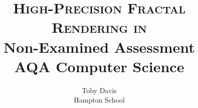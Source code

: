 \documentclass[12pt]{article}
\author{Toby Davis\\[0.2cm]Hampton School}
\title{
	\textsc{High-Precision Fractal Rendering in \CPP}\\[2.2cm]
	
	
	{\LARGE \bfseries
		Non-Examined Assessment}\\
	{\Large\bfseries
		AQA Computer Science}
}
\begin{document}
	
 
    \pagebreak
    
	
 
    \pagebreak
	
	
	\pagebreak
	

	\pagebreak
	
	
\end{document}
